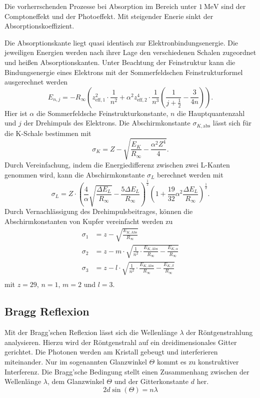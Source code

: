 Die vorherrschenden Prozesse bei Absorption im Bereich unter $\SI{1}{\mega\eV}$ sind der Comptoneffekt und
der Photoeffekt. Mit steigender Enerie sinkt der Absorptionskoeffizient.

Die Absorptionskante liegt quasi identisch zur Elektronbindungsenergie. Die jeweiligen Energien werden nach
ihrer Lage den verschiedenen Schalen zugeordnet und heißen Absorptionskanten.
Unter Beachtung der Feinstruktur kann die Bindungsenergie eines Elektrons mit der Sommerfeldschen Feinstrukturformel
ausgerechnet werden
\begin{equation*}\label{eq:Bindungsenergie_Sommerfeld}
    E_{n,j} = -R_\infty \left(z_{\text{eff},1}^2 \cdot \frac{1}{n^2} + α^2z_{\text{eff},2}^4 \cdot \frac{1}{n^3}\left(\frac{1}{j + \frac{1}{2}} - \frac{3}{4n}\right)\right).
\end{equation*}
Hier ist $α$ die Sommerfeldsche Feinstrukturkonstante, $n$ die Hauptquantenzahl und $j$ der Drehimpuls des Elektrons.
Die Abschirmkonstante $σ_{K,\text{abs}}$ lässt sich für die K-Schale bestimmen mit
\begin{equation*}\label{eq:Abschirmkonstante_K}
    σ_K = Z - \sqrt{\frac{E_K}{R_\infty} - \frac{α^2Z^4}{4}}.
\end{equation*}
Durch Vereinfachung, indem die Energiedifferenz zwischen zwei L-Kanten genommen wird, kann die Abschirmkonstante
$σ_L$ berechnet werden mit
\begin{equation*}\label{eq:Abschirmkonstante_L}
    σ_L = Z \cdot \left(\frac{4}{α}\sqrt{\frac{ΔE_L}{R_\infty}} - \frac{5ΔE_L}{R_{\infty}}\right)^{\frac{1}{2}}\left(1 + \frac{19}{32}α^2\frac{ΔE_L}{R_{\infty}}\right)^{\frac{1}{2}}.
\end{equation*}
Durch Vernachlässigung des Drehimpulsbeitrages, können die Abschirmkonstanten von Kupfer vereinfacht werden zu
\begin{align}\label{eq:sig}
    σ_1 &= z - \sqrt{\frac{E_{K,\text{Abs}}}{R_\infty}}\\
    σ_2 &= z - m \cdot \sqrt{\frac{1}{n^2} \cdot \frac{E_{K,\text{Abs}}}{R_\infty} - \frac{E_{K,α}}{R_\infty}}\\
    σ_3 &= z - l \cdot \sqrt{\frac{1}{n^2} \cdot \frac{E_{K,\text{Abs}}}{R_\infty} - \frac{E_{K,β}}{R_\infty}} \\
\end{align}
mit $z = 29$, $n = 1$, $m = 2$ und $l = 3$.

\subsection{Bragg Reflexion}
\label{sec:Bragg_Reflexion}
Mit der Bragg'schen Reflexion lässt sich die Wellenlänge $λ$ der Röntgenstrahlung analysieren.
Hierzu wird der Röntgenstrahl auf ein dreidimensionales Gitter gerichtet. Die Photonen werden am Kristall 
gebeugt und interferieren miteinander. Nur im sogenannten Glanzwinkel $\Theta$ kommt es zu konstruktiver Interferenz.
Die Bragg'sche Bedingung stellt einen Zusammenhang zwischen der Wellenlänge $λ$, dem Glanzwinkel $\Theta$ und der Gitterkonstante $d$ her.
\begin{equation}\label{eq:Bragg_Bedingung}
    2 d \sin(\Theta) = n λ
\end{equation}


